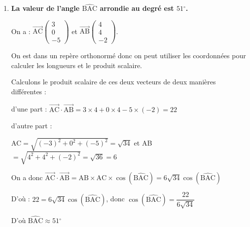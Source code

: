 \documentclass[10pt]{article}
\providecommand{\degres}{\ensuremath{^\circ}}
\providecommand{\vect}[1]{\overrightarrow{#1}}
\providecommand{\degres}{{^\circ}}
\begin{document}
\begin{enumerate}
Les vecteurs normaux sont orthogonaux donc les plans sont perpendiculaires.
\item  \textbf{La valeur de l'angle $\widehat{\mathrm{B A C}}$ arrondie au degré est  $51\degres$.}

On a : $\vect{\mathrm{AC}} \begin{pmatrix}
	3 \\ 0 \\ -5
\end{pmatrix}$ et $\vect{\mathrm{AB}} \begin{pmatrix}  4\\4\\-2
\end{pmatrix}$.

On est dans un repère orthonormé donc on peut utiliser les coordonnées pour calculer les longueurs et le produit scalaire.

Calculons le produit scalaire de ces deux vecteurs de deux manières différentes :

d'une part : $\vect{\mathrm{AC}}\cdot \vect{\mathrm{AB}} = 3\times4 + 0 \times 4 -5 \times (-2)= 22$

d'autre part :

AC$=\sqrt{(-3)^2+0^2+ (-5)^2}=\sqrt{34}$ et AB$=\sqrt{4^2+4^2+(-2)^2} =\sqrt{36} = 6$

On a donc  $\vect{\mathrm{AC}}\cdot \vect{\mathrm{AB} }= \text{AB} \times \text{AC} \times \cos \left(\widehat{\text{BAC}} \right)= 6\sqrt{34} \cos \left(\widehat{\text{BAC}} \right)$

D'où : $ 22 = 6\sqrt{34} \cos \left(\widehat{\text{BAC}}\right)$, 
donc $ \cos \left(\widehat{\text{BAC}} \right) =\dfrac{22}{6\sqrt{34}} $

D'où $ \widehat{\text{BAC}} \approx 51\degres$
\end{enumerate}
\medskip
\end{document}
